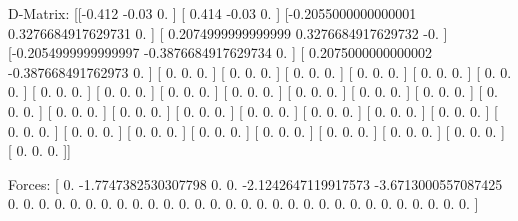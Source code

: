 D-Matrix:
[[-0.412              -0.03                0.                ]
 [ 0.414              -0.03                0.                ]
 [-0.2055000000000001  0.3276684917629731  0.                ]
 [ 0.2074999999999999  0.3276684917629732 -0.                ]
 [-0.2054999999999997 -0.3876684917629734  0.                ]
 [ 0.2075000000000002 -0.387668491762973   0.                ]
 [ 0.                  0.                  0.                ]
 [ 0.                  0.                  0.                ]
 [ 0.                  0.                  0.                ]
 [ 0.                  0.                  0.                ]
 [ 0.                  0.                  0.                ]
 [ 0.                  0.                  0.                ]
 [ 0.                  0.                  0.                ]
 [ 0.                  0.                  0.                ]
 [ 0.                  0.                  0.                ]
 [ 0.                  0.                  0.                ]
 [ 0.                  0.                  0.                ]
 [ 0.                  0.                  0.                ]
 [ 0.                  0.                  0.                ]
 [ 0.                  0.                  0.                ]
 [ 0.                  0.                  0.                ]
 [ 0.                  0.                  0.                ]
 [ 0.                  0.                  0.                ]
 [ 0.                  0.                  0.                ]
 [ 0.                  0.                  0.                ]
 [ 0.                  0.                  0.                ]
 [ 0.                  0.                  0.                ]
 [ 0.                  0.                  0.                ]
 [ 0.                  0.                  0.                ]
 [ 0.                  0.                  0.                ]
 [ 0.                  0.                  0.                ]
 [ 0.                  0.                  0.                ]
 [ 0.                  0.                  0.                ]
 [ 0.                  0.                  0.                ]
 [ 0.                  0.                  0.                ]
 [ 0.                  0.                  0.                ]]

Forces:
[ 0.                 -1.7747382530307798  0.
  0.                 -2.1242647119917573 -3.6713000557087425
  0.                  0.                  0.
  0.                  0.                  0.
  0.                  0.                  0.
  0.                  0.                  0.
  0.                  0.                  0.
  0.                  0.                  0.
  0.                  0.                  0.
  0.                  0.                  0.
  0.                  0.                  0.
  0.                  0.                  0.                ]

